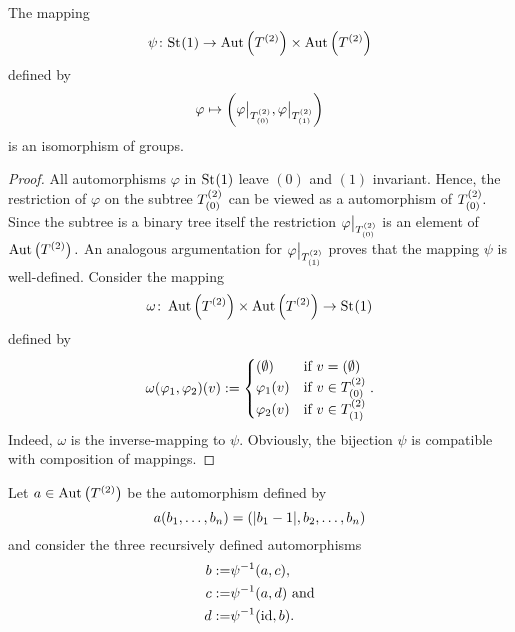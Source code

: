 \begin{lem}\label{thm:Homomorphism psi}
The mapping
\[ \psi\colon\mathrm{St}_{}(1)\to\operatorname{Aut}\left(T^{(2)}\right)\times\operatorname{Aut}\left(T^{(2)}\right) \]
defined by
\begin{equation*}
\varphi\mapsto\left(\varphi\big\vert_{T^{(2)}_{(0)}},\varphi\big\vert_{T^{(2)}_{(1)}}\right)
\end{equation*}
is an isomorphism of groups.
\end{lem}
\begin{proof}\sloppypar
All automorphisms $\varphi$ in $\mathrm{St}_{}(1)$ leave $(0)$ and $(1)$ invariant. Hence, the restriction of $\varphi$ on the subtree $T^{(2)}_{(0)}$ can be viewed as a automorphism of $T^{(2)}_{(0)}.$ Since the subtree is a binary tree itself the restriction $\varphi\big\vert_{T^{(2)}_{(0)}}$ is an element of $\operatorname{Aut}\left(T^{(2)}\right).$ An analogous argumentation for $\varphi\big\vert_{T^{(2)}_{(1)}}$ proves that the mapping $\psi$ is well-defined.
Consider the mapping
\[\omega\colon\operatorname{Aut}\left(T^{(2)}\right)\times\operatorname{Aut}\left(T^{(2)}\right)\to\mathrm{St}_{}(1)\]
defined by
\begin{equation*}
\omega(\varphi_1,\varphi_2)(v):=
\begin{cases}
(\emptyset)			& \text{if } v=(\emptyset)\\
\varphi_1(v)	& \text{if } v\in T^{(2)}_{(0)}\\
\varphi_2(v)	& \text{if } v\in T^{(2)}_{(1)}\\
\end{cases}.
\end{equation*}
Indeed, $\omega$ is the inverse-mapping to $\psi.$ Obviously, the bijection $\psi$ is compatible with composition of mappings.
\end{proof}

Let $a\in\operatorname{Aut}\left(T^{(2)}\right)$ be the automorphism defined by
\begin{equation*}
a(b_{1},\ldots,b_{n})=(\lvert b_1-1 \rvert,b_2,\ldots,b_n)
\end{equation*}
and consider the three recursively defined automorphisms
\begin{align*}
b:=&\psi^{-1}(a,c),\\
c:=&\psi^{-1}(a,d) \text{ and}\\
d:=&\psi^{-1}(\operatorname{id},b).
\end{align*}

